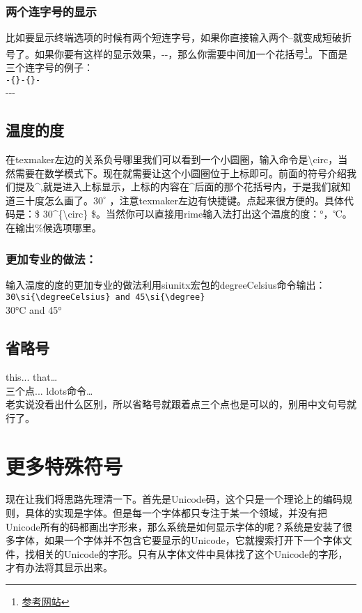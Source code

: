\documentclass[11pt,oneside]{book}
\begin{document}
  \subsubsection{两个连字号的显示}
  比如要显示终端选项的时候有两个短连字号，如果你直接输入两个--就变成短破折号了。如果你要有这样的显示效果，-{}-，那么你需要中间加一个花括号\footnote{\href{http://tex.stackexchange.com/questions/9813/how-can-i-stop-latex-from-converting-two-hyphens-to-a-single-hyphen-when-loading}{参考网站}}。下面是三个连字号的例子：\\
  \verb+-{}-{}-+\\
  -{}-{}-


  \subsection{温度的度}
  在texmaker左边的关系负号哪里我们可以看到一个小圆圈，输入命令是\textbackslash circ，当然需要在数学模式下。现在就需要让这个小圆圈位于上标即可。前面的符号介绍我们提及\^{},就是进入上标显示，上标的内容在\^{}后面的那个花括号内，于是我们就知道三十度怎么画了。$ 30^{\circ} $ ，注意texmaker左边有快捷键。点起来很方便的。具体代码是：\$ 30\^{}\{\textbackslash circ\} \$。当然你可以直接用rime输入法打出这个温度的度：°，℃。在输出\%候选项哪里。

  \subsubsection{更加专业的做法：}
  输入温度的度的更加专业的做法利用siunitx宏包的degreeCelsius命令输出：\\
  \verb+30\si{\degreeCelsius} and 45\si{\degree}+\\
  30\si{\degreeCelsius} and 45\si{\degree}


  \subsection{省略号}
  this...   that\ldots   \\
  三个点...   ldots命令\ldots  \\
  老实说没看出什么区别，所以省略号就跟着点三个点也是可以的，别用中文句号就行了。



  \section{更多特殊符号}
  现在让我们将思路先理清一下。首先是Unicode码，这个只是一个理论上的编码规则，具体的实现是字体。但是每一个字体都只专注于某一个领域，并没有把Unicode所有的码都画出字形来，那么系统是如何显示字体的呢？系统是安装了很多字体，如果一个字体并不包含它要显示的Unicode，它就搜索打开下一个字体文件，找相关的Unicode的字形。只有从字体文件中具体找了这个Unicode的字形，才有办法将其显示出来。
\end{document}

